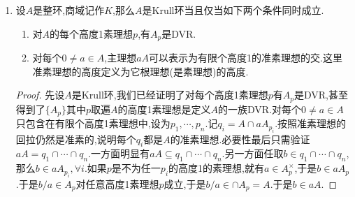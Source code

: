 \begin{enumerate}
\begin{proof}
		下面证明命题中的等式.只需证明$p$跑遍高度1素理想时有$\cap A_p\subseteq A$.任取$x=a'/a\in\cap A_p$,其中$a',a\in A$.不妨设$a$非零非单位.特别的,对每个高度1素理想$p$都有$a'\in aA_p$.按照$A$是Krull环,只存在有限个$R_{\lambda}$使得$aR_{\lambda}\not=R_{\lambda}$.设这有限个DVR为$R_1,\cdots,R_n$(存在是因为如果都有$aR_{\lambda}=R_{\lambda}$会导致$a\in A$是单位).记$q_i=A\cap aR_i$和$p_i=A\cap m_i$.那么有$aA=\cap_{\lambda\in\wedge}(aR_{\lambda}\cap A)=q_1\cap\cdots\cap q_n$.不妨设这个交是不可缩短的,换句话讲$q_i$之间没有互相包含关系.我们断言这里每个$p_i$的高度都是1,否则的话不妨设$p_1$的高度$>1$.那么$A_{p_1}$是维数为$\mathrm{ht}(p_1)>1$的被$\{R_{\lambda}\}_{\lambda\in\wedge_1}$定义的Krull环,其中$\wedge_1=\{\lambda\in\wedge\mid A_{p_1}\subseteq R_{\lambda}\}$.按照$\dim A_{p_1}>1$,结合有限DVR交的Krull环的结构知,这里$\wedge_1$必然是无限集.于是特别的可取$R'=$某个$R_{\lambda_1}$,其中$\lambda_1\in\wedge_1$,使得$aR'=R'$.记$p'=A\cap m_{R'}$,我们断言$p'\not=\{0\}$,否则的话$K\subseteq R'$矛盾.从$A_{p_1}\subseteq R'$和$(A-p_1)\cap m_{R'}=\emptyset$得到$p'\subseteq p_1$.按照$R_1$是DVR,有足够大的正整数$v$使得$m_{R_1}^v\subseteq aR_1$,于是$p_1^v\subseteq q_1$.从$aA=q_1\cap\cdots\cap q_n$是不可缩短的,得到$q_2\cap\cdots\cap q_n\not\subseteq aA$,于是存在整数$i\ge0$使得$p_1^i\cap q_2\cap\cdots\cap q_n\not\subseteq aA$和$p_1^{i+1}\cap q_2\cap\cdots\cap q_n\subseteq aA$.取$b\in(p_1^i\cap q_2\cap\cdots\cap q_n)-aA$,得到$b\not\in aA$且$bp_1\subseteq aA$.于是$(b/a)p'\subseteq(b/a)p_1\subseteq A\subseteq R'$.按照$a\in R'$可逆.就有$(b/a)p'\subseteq A\cap m_{R'}=p'\subseteq A$.于是对任意$0\not=c\in p'$和任意$n\ge0$,都有$(b/a)^nc\in p'\subseteq A$.按照$A$是完全整闭环,得到$b/a\in A$,导致$b\in aA$和$b$的选取矛盾,这个矛盾说明我们一开始设的$p_i$高度不全为1矛盾.于是这里$R_i=A_{p_i}$,导致$a'\in A\cap aR_i=q_i$,于是$a'\in aA=q_1\cap\cdots\cap q_n$,也即$x=a'/a\in A$.		
	\end{proof}
    \item 设$A$是整环,商域记作$K$,那么$A$是Krull环当且仅当如下两个条件同时成立.
    \begin{enumerate}
    	\item 对$A$的每个高度1素理想$p$,有$A_p$是DVR.
    	\item 对每个$0\not=a\in A$,主理想$aA$可以表示为有限个高度1的准素理想的交.这里准素理想的高度定义为它根理想(是素理想)的高度.
    \end{enumerate}
    \begin{proof}
    	
    	先设$A$是Krull环,我们已经证明了对每个高度1素理想$p$有$A_p$是DVR,甚至得到了$\{A_p\}$其中$p$取遍$A$的高度1素理想是定义$A$的一族DVR.对每个$0\not=a\in A$只包含在有限个高度1素理想中,设为$p_1,\cdots,p_n$.记$q_i=A\cap aA_{p_i}$.按照准素理想的回拉仍然是准素的,说明每个$q_i$都是$A$的准素理想.必要性最后只需验证$aA=q_1\cap\cdots\cap q_n$.一方面明显有$aA\subseteq q_1\cap\cdots\cap q_n$.另一方面任取$b\in q_1\cap\cdots\cap q_n$,那么$b\in aA_{p_i},\forall i$.如果$p$是不为任一$p_i$的高度1的素理想,就有$a\in A_p^{\times}$,于是$b\in aA_p$.于是$b/a\in A_p$对任意高度1素理想$p$成立,于是$b/a\in\cap A_p=A$.于是$b\in aA$.
    	

\end{proof}
\end{enumerate}
